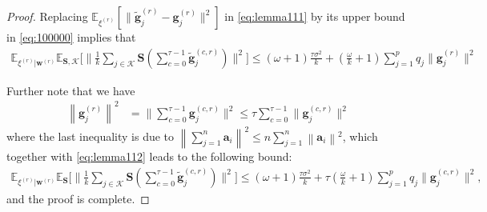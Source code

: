 \documentclass[twoside]{article}
\begin{document}
\begin{proof}
Replacing $\mathbb{E}_{\xi^{(r)}}\left[\|{\tilde{\mathbf{g}}_j^{(r)}}-{\mathbf{g}_j^{(r)}}\|^2\right]$ in \eqref{eq:lemma111} by its upper bound in \eqref{eq:100000} implies that 
\begin{align}
\mathbb{E}_{{\xi^{(r)}|\boldsymbol{w}^{(r)}}}\mathbb{E}_{\mathbf{S},\mathcal{K}}\Big[\|\frac{1}{k}\sum_{j\in\mathcal{K}} \mathbf{S}\left(\sum_{c=0}^{\tau-1}\tilde{\mathbf{g}}^{(c,r)}_j\right)\|^2\Big]
\leq (\omega+1)\frac{\tau\sigma^2}{k}+(\frac{\omega}{k}+1)\sum_{j=1}^pq_j\|{\mathbf{g}}_{j}^{(r)}\|^2\label{eq:lemma112}
\end{align}

Further note that we have 
\begin{align}
\left\|{\mathbf{g}}_j^{(r)}\right\|^2&=\|\sum_{c=0}^{\tau-1}\mathbf{g}_j^{(c,r)}\|^2\stackrel{}{\leq} \tau\sum_{c=0}^{\tau-1}\|\mathbf{g}_j^{(c,r)}\|^2\label{eq:mid-bounding-absg}
\end{align} 
where the last inequality is due to $\left\|\sum_{j=1}^n\mathbf{a}_i\right\|^2\leq n\sum_{j=1}^n\left\|\mathbf{a}_i\right\|^2$, which together with \eqref{eq:lemma112} leads to the following bound:
\begin{align}
    \mathbb{E}_{{\xi^{(r)}|\boldsymbol{w}^{(r)}}}\mathbb{E}_{\mathbf{S}}\Big[\|\frac{1}{k}\sum_{j\in\mathcal{K}} \mathbf{S}\left(\sum_{c=0}^{\tau-1}\tilde{\mathbf{g}}^{(c,r)}_j\right)\|^2\Big]\leq(\omega+1)\frac{\tau\sigma^2}{k}+\tau(\frac{\omega}{k}+1)\sum_{j=1}^pq_j\|{\mathbf{g}}_{j}^{(c,r)}\|^2,
\end{align}
and the proof is complete.
\end{proof}
\end{document}
